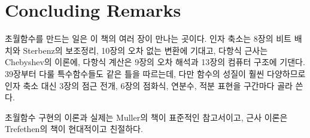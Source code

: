 \section{Concluding Remarks}

초월함수를 만드는 일은 이 책의 여러 장이 만나는 곳이다. 인자 축소는 8장의 비트 배치와 Sterbenz의 보조정리, 10장의 오차 없는 변환에 기대고, 다항식 근사는 Chebyshev의 이론에, 다항식 계산은 9장의 오차 해석과 13장의 컴퓨터 구조에 기댄다. 39장부터 다룰 특수함수들도 같은 틀을 따르는데, 다만 함수의 성질이 훨씬 다양하므로 인자 축소 대신 3장의 점근 전개, 6장의 점화식, 연분수, 적분 표현을 구간마다 골라 쓴다.

초월함수 구현의 이론과 실제는 Muller의 책\cite{muller2016elementary}이 표준적인 참고서이고, 근사 이론은 Trefethen의 책\cite{trefethen2019atap}이 현대적이고 친절하다.

\chapterreferences

